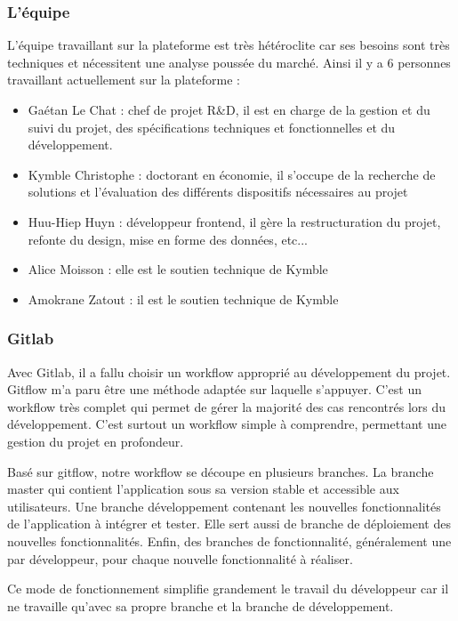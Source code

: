 \documentclass[french]{article}
\begin{document}
{\subsubsection{L'équipe}

L'équipe travaillant sur la plateforme est très hétéroclite car ses besoins sont très techniques et nécessitent une analyse poussée du marché. Ainsi il y a 6 personnes travaillant actuellement sur la plateforme :

\begin{itemize}
    \item Gaétan Le Chat : chef de projet R\&D, il est en charge de la gestion et du suivi du projet, des spécifications techniques et fonctionnelles et du développement.
    \item Kymble Christophe : doctorant en économie, il s'occupe de la recherche de solutions et l'évaluation des différents dispositifs nécessaires au projet
    \item Huu-Hiep Huyn : développeur frontend, il gère la restructuration du projet, refonte du design, mise en forme des données, etc...
    \item Alice Moisson : elle est le soutien technique de Kymble
    \item Amokrane Zatout : il est le soutien technique de Kymble
\end{itemize}

\subsubsection{Gitlab}

Avec Gitlab, il a fallu choisir un workflow approprié au développement du projet. Gitflow m'a paru être une méthode adaptée sur laquelle s'appuyer. C'est un workflow très complet qui permet de gérer la majorité des cas rencontrés lors du développement. C'est surtout un workflow simple à comprendre, permettant une gestion du projet en profondeur. \cite{workflow}

Basé sur gitflow, notre workflow se découpe en plusieurs branches. La branche master qui contient l'application sous sa version stable et accessible aux utilisateurs. Une branche développement contenant les nouvelles fonctionnalités de l'application à intégrer et tester. Elle sert aussi de branche de déploiement des nouvelles fonctionnalités. Enfin, des branches de fonctionnalité, généralement une par développeur, pour chaque nouvelle fonctionnalité à réaliser.

Ce mode de fonctionnement simplifie grandement le travail du développeur car il ne travaille qu'avec sa propre branche et la branche de développement.

}
\end{document}
